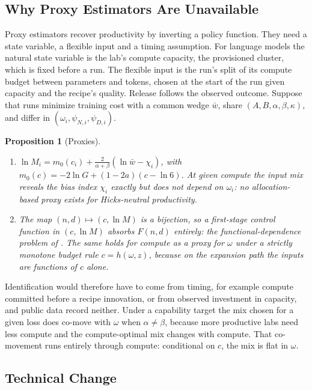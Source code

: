 \documentclass[AER,finalmode]{AEA}
\newtheorem{proposition}{Proposition}
\theoremstyle{definition}
\theoremstyle{remark}
\begin{document}
\subsection{Why Proxy Estimators Are Unavailable}\label{sec:proxies}

Proxy estimators \citep{olley1996dynamics,levinsohn2003estimating,ackerberg2015identification} recover productivity by
inverting a policy function. They need a state variable, a flexible input and a timing assumption. For language models
the natural state variable is the lab's compute capacity, the provisioned cluster, which is fixed before a run. The
flexible input is the run's split of its compute budget between parameters and tokens, chosen at the start of the run
given capacity and the recipe's quality. Release follows the observed outcome. Suppose that runs minimize training
cost with a common wedge $\bar w$, share $(A,B,\alpha,\beta,\kappa)$, and differ in $(\omega_i,\psi_{N,i},\psi_{D,i})$.

\begin{proposition}[Proxies]\label{prop:proxy}
\begin{enumerate}
\item[(i)] $\ln M_i=m_0(c_i)+\frac{2}{\alpha+\beta}(\ln\bar w-\chi_i)$, with $m_0(c)=-2\ln G+(1-2a)(c-\ln6)$. At given
compute the input mix reveals the bias index $\chi_i$ exactly but does not depend on $\omega_i$: no allocation-based
proxy exists for Hicks-neutral productivity.
\item[(ii)] The map $(n,d)\mapsto(c,\ln M)$ is a bijection, so a first-stage control function in $(c,\ln M)$ absorbs
$F(n,d)$ entirely: the functional-dependence problem of \citet{ackerberg2015identification}. The same holds for compute
as a proxy for $\omega$ under a strictly monotone budget rule $c=h(\omega,z)$, because on the expansion path the inputs
are functions of $c$ alone.
\end{enumerate}
\end{proposition}

Identification would therefore have to come from timing, for example compute committed before a recipe innovation, or
from observed investment in capacity, and public data record neither. Under a capability target the mix chosen for a
given loss does co-move with $\omega$ when $\alpha\neq\beta$, because more productive labs need less compute and the
compute-optimal mix changes with compute. That co-movement runs entirely through compute: conditional on $c$, the mix is
flat in $\omega$.

\subsection{Technical Change}\label{sec:dmr}
\end{document}
